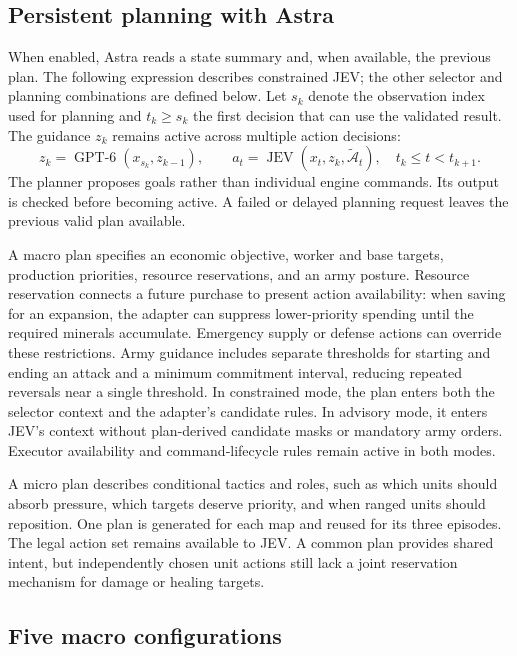 \documentclass{article}
\begin{document}
\subsection{Persistent planning with Astra}

When enabled, Astra reads a state summary and, when available, the previous plan. The following expression describes constrained JEV; the other selector and planning combinations are defined below. Let \(s_k\) denote the observation index used for planning and \(t_k\geq s_k\) the first decision that can use the validated result. The guidance \(z_k\) remains active across multiple action decisions:
\begin{equation}
    z_k=\operatorname{GPT\text{-}6}(x_{s_k},z_{k-1}), \qquad
    a_t=\operatorname{JEV}(x_t,z_k,\widetilde{\mathcal{A}}_t), \quad
    t_k\leq t<t_{k+1}.
\end{equation}
The planner proposes goals rather than individual engine commands. Its output is checked before becoming active. A failed or delayed planning request leaves the previous valid plan available.

A macro plan specifies an economic objective, worker and base targets, production priorities, resource reservations, and an army posture. Resource reservation connects a future purchase to present action availability: when saving for an expansion, the adapter can suppress lower-priority spending until the required minerals accumulate. Emergency supply or defense actions can override these restrictions. Army guidance includes separate thresholds for starting and ending an attack and a minimum commitment interval, reducing repeated reversals near a single threshold. In constrained mode, the plan enters both the selector context and the adapter's candidate rules. In advisory mode, it enters JEV's context without plan-derived candidate masks or mandatory army orders. Executor availability and command-lifecycle rules remain active in both modes.

A micro plan describes conditional tactics and roles, such as which units should absorb pressure, which targets deserve priority, and when ranged units should reposition. One plan is generated for each map and reused for its three episodes. The legal action set remains available to JEV. A common plan provides shared intent, but independently chosen unit actions still lack a joint reservation mechanism for damage or healing targets.

\subsection{Five macro configurations}
\label{sec:configurations}
\end{document}

